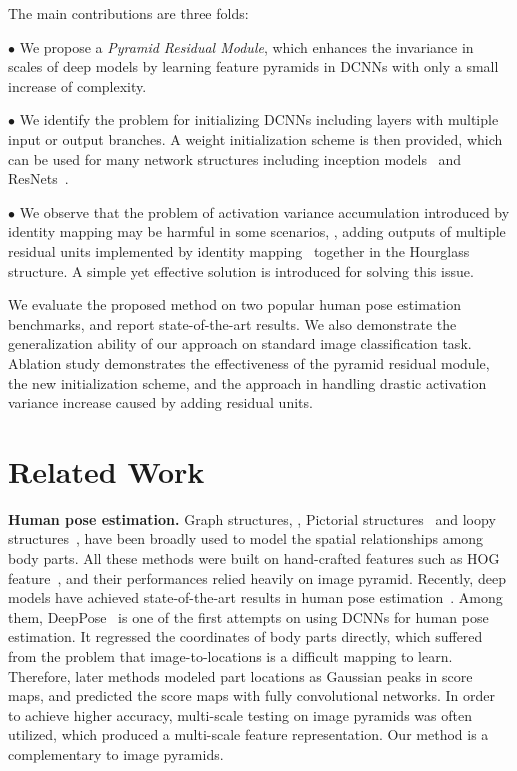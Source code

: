 \documentclass[10pt,twocolumn,letterpaper]{article}
\newcommand{\smalltitle}[1]{\vspace{0.2em}\noindent \textbf{{#1}}}
\newenvironment{myitemize}[1][]{
\begin{list}{{#1}} 
	{
		\setlength{\leftmargin}{1.2em}
		\setlength{\topsep}{0em}
		\setlength{\itemsep}{-0.2em}
}}
{\end{list}}
\begin{document}
The main contributions are three folds:
\begin{myitemize}
	\item[$\bullet$] We propose a \textit{Pyramid Residual Module}, which enhances the invariance in scales of deep models by learning feature pyramids in DCNNs with only a small increase of complexity.
	\item[$\bullet$] We identify the problem for initializing DCNNs including layers with multiple input or output branches. A weight initialization scheme is then provided, which can be used for many network structures including inception models~\cite{szegedy2015going,ioffe2015batch,szegedy2016rethinking,szegedy2016inception} and ResNets~\cite{he2016deep,he2016identity}.
	\item[$\bullet$] We observe that the problem of activation variance accumulation introduced by identity mapping may be harmful in some scenarios, \eg, adding outputs of multiple residual units implemented by identity mapping~\cite{he2016identity} together in the Hourglass structure. A simple yet effective solution is introduced for solving this issue. 
\end{myitemize}
We evaluate the proposed method on two popular human pose estimation benchmarks, and report state-of-the-art results. 
We also demonstrate the generalization ability of our approach on standard image classification task. 
Ablation study demonstrates the effectiveness of the pyramid residual module, the new initialization scheme, and the approach in handling drastic activation variance increase caused by adding residual units.





\section{Related Work}
\smalltitle{Human pose estimation. }
Graph structures, \eg, Pictorial structures~\cite{fischler1973representation,felzenszwalb2005pictorial,yang2011articulated} and loopy structures~\cite{ren2005recovering,tian2010fast,ferrari20092d}, have been broadly used to model the spatial relationships among body parts. 
All these methods were built on hand-crafted features such as HOG feature~\cite{dalal2005histograms}, and their performances relied heavily on image pyramid. 
Recently, deep models have achieved state-of-the-art results in human pose estimation~\cite{belagiannis2016recurrent,insafutdinov2016deepercut,bulat2016human,wei2016convolutional,newell2016stacked,chu2016structure,yang2016end,chu2017multi,cao2017realtime,papandreou2017towards}. 
Among them, DeepPose~\cite{toshev2014deeppose} is one of the first attempts on using DCNNs for human pose estimation. 								 
It regressed the coordinates of body parts directly, which suffered from the problem that image-to-locations is a difficult mapping to learn. 
Therefore, later methods modeled part locations as Gaussian peaks in score maps, and predicted the score maps with fully convolutional networks. 
In order to achieve higher accuracy, multi-scale testing on image pyramids was often utilized, which produced a multi-scale feature representation. 
Our method is a complementary to image pyramids.
\end{document}

